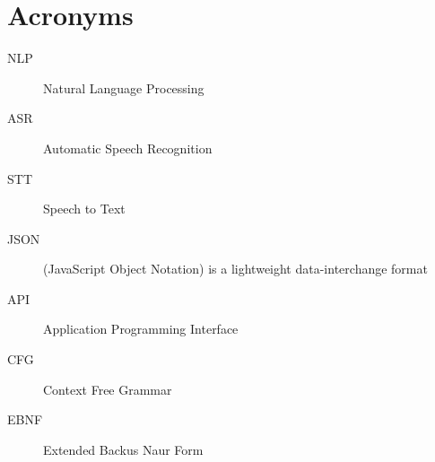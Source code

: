 
\chapter{Acronyms}
\begin{description}
	\item[NLP] Natural Language Processing
	\item[ASR] Automatic Speech Recognition
	\item[STT] Speech to Text
	\item[JSON] (JavaScript Object Notation) is a lightweight data-interchange format
	\item[API] Application Programming Interface
	\item[CFG] Context Free Grammar
	\item[EBNF] Extended Backus Naur Form
\end{description}
